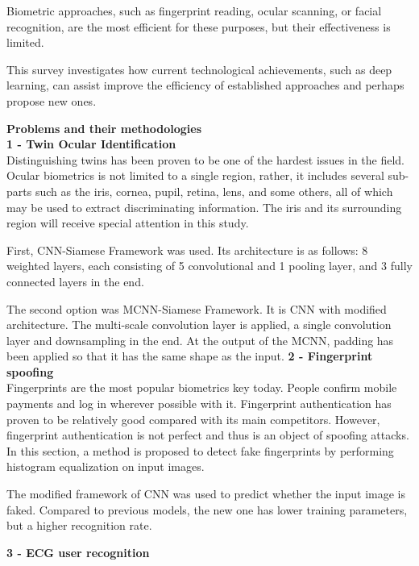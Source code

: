 \documentclass[a4paper, 12pt]{article}
\begin{document}
Biometric approaches, such as fingerprint reading, ocular scanning, or facial recognition, are the most efficient for these purposes, but their effectiveness is limited. 

This survey investigates how current technological achievements, such as deep learning, can assist improve the efficiency of established approaches and perhaps propose new ones. 

\clearpage

\Large \textbf{Problems and their methodologies}\\

\large \textbf{1 - Twin Ocular Identification}\\

Distinguishing twins has been proven to be one of the hardest issues in the field. Ocular biometrics is not limited to a single region, rather, it includes several sub-parts such as the iris, cornea, pupil, retina, lens, and some others, all of which may be used to extract discriminating information. The iris and its surrounding region will receive special attention in this study.

First, CNN-Siamese Framework was used. Its architecture is as follows: 8 weighted layers, each consisting of 5 convolutional and 1 pooling layer, and 3 fully connected layers in the end. 

The second option was MCNN-Siamese Framework. It is CNN with modified architecture. The multi-scale convolution layer is applied, a single convolution layer and downsampling in the end. At the output of the MCNN, padding has been applied so that it has the same shape as the input.
\bigbreak
\large \textbf{2 - Fingerprint spoofing}\\

Fingerprints are the most popular biometrics key today. People confirm mobile payments and log in wherever possible with it. Fingerprint authentication has proven to be relatively good compared with its main competitors. However, fingerprint authentication is not perfect and thus is an object of spoofing attacks. In this section, a method is proposed to detect fake fingerprints by performing histogram equalization on input images.

The modified framework of CNN was used to predict whether the input image is faked. Compared to previous models, the new one has lower training parameters, but a higher recognition rate.

\clearpage

\large \textbf{3 - ECG user recognition}\\
\end{document}
